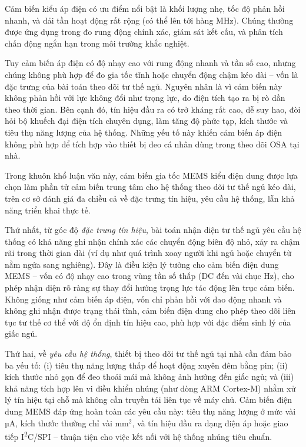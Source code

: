 \begin{enumerate}
    Cảm biến kiểu áp điện có ưu điểm nổi bật là khối lượng nhẹ, 
		tốc độ phản hồi nhanh, và dải tần hoạt động rất rộng 
		(có thể lên tới hàng MHz). Chúng thường được ứng dụng trong đo 
		rung động chính xác, giám sát kết cấu, và phân tích chấn động 
		ngắn hạn trong môi trường khắc nghiệt.

		Tuy cảm biến áp điện có độ nhạy cao với rung động nhanh và 
		tần số cao, nhưng chúng không phù hợp để đo gia tốc tĩnh hoặc 
		chuyển động chậm kéo dài – vốn là đặc trưng của bài toán theo 
		dõi tư thế ngủ. Nguyên nhân là vì cảm biến này không phản hồi với 
		lực không đổi như trọng lực, do điện tích tạo ra bị rò dần 
		theo thời gian. Bên cạnh đó, tín hiệu đầu ra có trở kháng rất cao, 
		dễ suy hao, đòi hỏi bộ khuếch đại điện tích chuyên dụng, 
		làm tăng độ phức tạp, kích thước và tiêu thụ năng lượng của 
		hệ thống. Những yếu tố này khiến cảm biến áp điện không phù hợp để tích hợp vào thiết bị đeo cá nhân dùng trong theo dõi OSA tại nhà.
\end{enumerate}


Trong khuôn khổ luận văn này, cảm biến gia tốc MEMS kiểu điện dung được 
lựa chọn làm phần tử cảm biến trung tâm cho hệ thống theo dõi tư thế 
ngủ kéo dài, trên cơ sở đánh giá đa chiều cả về đặc trưng tín hiệu, 
yêu cầu hệ thống, lẫn khả năng triển khai thực tế.

Thứ nhất, từ góc độ \textit{đặc trưng tín hiệu}, bài toán nhận diện tư 
thế ngủ yêu cầu hệ thống có khả năng ghi nhận chính xác các chuyển động 
biên độ nhỏ, xảy ra chậm rãi trong thời gian dài (ví dụ như quá trình 
xoay người khi ngủ hoặc chuyển từ nằm ngửa sang nghiêng). 
Đây là điều kiện lý tưởng cho cảm biến điện dung MEMS – 
vốn có độ nhạy cao trong vùng tần số thấp (DC đến vài chục Hz), 
cho phép nhận diện rõ ràng sự thay đổi hướng trọng lực tác động 
lên trục cảm biến. Không giống như cảm biến áp điện, vốn chỉ phản hồi 
với dao động nhanh và không ghi nhận được trạng thái tĩnh, 
cảm biến điện dung cho phép theo dõi liên tục tư thế cơ thể với 
độ ổn định tín hiệu cao, phù hợp với đặc điểm sinh lý của giấc ngủ.

Thứ hai, về \textit{yêu cầu hệ thống}, thiết bị theo dõi tư thế ngủ 
tại nhà cần đảm bảo ba yếu tố: (i) tiêu thụ năng lượng thấp để hoạt 
động xuyên đêm bằng pin; (ii) kích thước nhỏ gọn để đeo thoải mái 
mà không ảnh hưởng đến giấc ngủ; và (iii) khả năng tích hợp lên vi 
điều khiển nhúng (như dòng ARM Cortex-M) nhằm xử lý tín hiệu tại 
chỗ mà không cần truyền tải liên tục về máy chủ. Cảm biến điện dung 
MEMS đáp ứng hoàn toàn các yêu cầu này: tiêu thụ năng lượng ở mức 
vài µA, kích thước thường chỉ vài mm$^2$, và tín hiệu đầu ra dạng 
điện áp hoặc giao tiếp I\textsuperscript{2}C/SPI – thuận tiện cho 
việc kết nối với hệ thống nhúng tiêu chuẩn.

